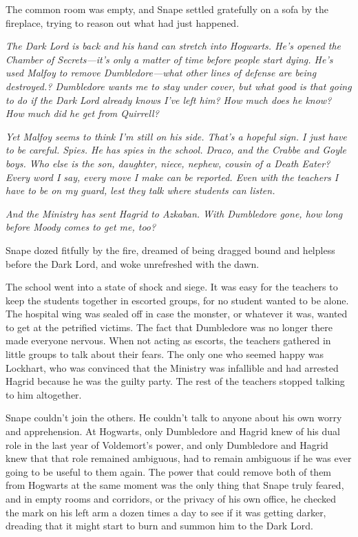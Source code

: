The common room was empty, and Snape settled gratefully on a sofa by the fireplace, trying to reason out what had just happened.

\emph{The Dark Lord is back and his hand can stretch into Hogwarts. He's opened the Chamber of Secrets—it's only a matter of time before people start dying. He's used Malfoy to remove Dumbledore—what other lines of defense are being destroyed.? Dumbledore wants me to stay under cover, but what good is that going to do if the Dark Lord already knows I've left him? How much does he know? How much did he get from Quirrell?}

\emph{Yet Malfoy seems to think I'm still on his side. That's a hopeful sign. I just have to be careful. Spies. He has spies in the school. Draco, and the Crabbe and Goyle boys. Who else is the son, daughter, niece, nephew, cousin of a Death Eater? Every word I say, every move I make can be reported. Even with the teachers I have to be on my guard, lest they talk where students can listen.}

\emph{And the Ministry has sent Hagrid to Azkaban. With Dumbledore gone, how long before Moody comes to get me, too?}

Snape dozed fitfully by the fire, dreamed of being dragged bound and helpless before the Dark Lord, and woke unrefreshed with the dawn.

The school went into a state of shock and siege. It was easy for the teachers to keep the students together in escorted groups, for no student wanted to be alone. The hospital wing was sealed off in case the monster, or whatever it was, wanted to get at the petrified victims. The fact that Dumbledore was no longer there made everyone nervous. When not acting as escorts, the teachers gathered in little groups to talk about their fears. The only one who seemed happy was Lockhart, who was convinced that the Ministry was infallible and had arrested Hagrid because he was the guilty party. The rest of the teachers stopped talking to him altogether.

Snape couldn't join the others. He couldn't talk to anyone about his own worry and apprehension. At Hogwarts, only Dumbledore and Hagrid knew of his dual role in the last year of Voldemort's power, and only Dumbledore and Hagrid knew that that role remained ambiguous, had to remain ambiguous if he was ever going to be useful to them again. The power that could remove both of them from Hogwarts at the same moment was the only thing that Snape truly feared, and in empty rooms and corridors, or the privacy of his own office, he checked the mark on his left arm a dozen times a day to see if it was getting darker, dreading that it might start to burn and summon him to the Dark Lord.

